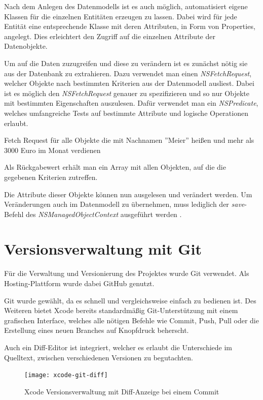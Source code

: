 Nach dem Anlegen des Datenmodells ist es auch möglich, automatisiert eigene Klassen für die einzelnen Entitäten erzeugen zu lassen. Dabei wird für jede Entität eine entsprechende Klasse mit deren Attributen, in Form von Properties, angelegt. Dies erleichtert den Zugriff auf die einzelnen Attribute der Datenobjekte.

Um auf die Daten zuzugreifen und diese zu verändern ist es zunächst nötig sie aus der Datenbank zu extrahieren. Dazu verwendet man einen \emph{NSFetchRequest}, welcher Objekte nach bestimmten Kriterien aus der Datenmodell ausliest.
Dabei ist es möglich den \emph{NSFetchRequest} genauer zu spezifizieren und so nur Objekte mit bestimmten Eigenschaften auszulesen.
Dafür verwendet man ein \emph{NSPredicate}, welches umfangreiche Tests auf bestimmte Attribute und logische Operationen erlaubt.

\begin{listing}[htb! breaklines=true]
    \caption{Fetch Request für alle Objekte die mit Nachnamen ''Meier'' heißen und mehr als 3000 Euro im Monat verdienen}
	\label{lst:NSFetchRequest_objc}
\end{listing}

Als Rückgabewert erhält man ein Array mit allen Objekten, auf die die gegebenen Kriterien zutreffen.

Die Attribute dieser Objekte können nun ausgelesen und verändert werden. Um Veränderungen auch im Datenmodell zu übernehmen, muss lediglich der \emph{save}-Befehl des \emph{NSManagedObjectContext} ausgeführt werden \cite{coredataguide}.

\section{Versionsverwaltung mit Git}
\label{sec:tools:git}
Für die Verwaltung und Versionierung des Projektes wurde Git verwendet. Als Hosting-Plattform wurde dabei GitHub \cite{github} genutzt.

Git wurde gewählt, da es schnell und vergleichsweise einfach zu bedienen ist. Des Weiteren bietet Xcode bereits standardmäßig Git-Unterstützung mit einem grafischen Interface, welches alle nötigen Befehle wie Commit, Push, Pull oder die Erstellung eines neuen Branches auf Knopfdruck beherscht.

Auch ein Diff-Editor ist integriert, welcher es erlaubt die Unterschiede im Quelltext, zwischen verschiedenen Versionen zu begutachten.

\begin{figure}[htb!]
		  \centering
	\texttt{[image: xcode-git-diff]}
	\caption{Xcode Versionsverwaltung mit Diff-Anzeige bei einem Commit}
	\label{xcode-git-diff}
\end{figure}


